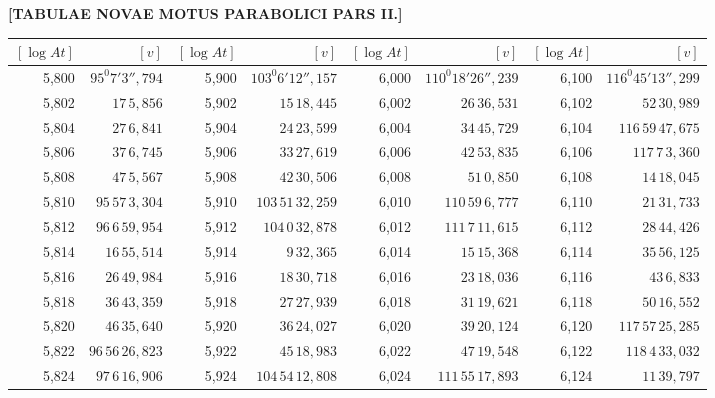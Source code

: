 \clearpage
{}
\begingroup
\centering
\fontsize{9}{9}\selectfont
\setlength{\tabcolsep}{1pt}
\renewcommand{\arraystretch}{.9}
\setlength{\parskip}{0pt}
\textbf{[TABULAE NOVAE MOTUS PARABOLICI PARS II.]}
\par\vspace{7pt}
\begin{tabular}{|r|r||r|r||r|r||r|r|}
\hline
\([\log At]\) & \([v]\) & \([\log At]\) & \([v]\) & \([\log At]\) & \([v]\) & \([\log At]\) & \([v]\) \\
\hline
5,800 & \(95^{0}7'3'',\!794\) & 5,900 & \(103^{0}6'12'',\!157\) & 6,000 & \(110^{0}18'26'',\!239\) & 6,100 & \(116^{0}45'13'',\!299\) \\[1pt]
5,802 & \(17\,5,\!856\) & 5,902 & \(15\,18,\!445\) & 6,002 & \(26\,36,\!531\) & 6,102 & \(52\,30,\!989\) \\
5,804 & \(27\,6,\!841\) & 5,904 & \(24\,23,\!599\) & 6,004 & \(34\,45,\!729\) & 6,104 & \(116\,59\,47,\!675\) \\
5,806 & \(37\,6,\!745\) & 5,906 & \(33\,27,\!619\) & 6,006 & \(42\,53,\!835\) & 6,106 & \(117\,7\,3,\!360\) \\
5,808 & \(47\,5,\!567\) & 5,908 & \(42\,30,\!506\) & 6,008 & \(51\,0,\!850\) & 6,108 & \(14\,18,\!045\) \\
5,810 & \(95\,57\,3,\!304\) & 5,910 & \(103\,51\,32,\!259\) & 6,010 & \(110\,59\,6,\!777\) & 6,110 & \(21\,31,\!733\) \\[1pt]
5,812 & \(96\,6\,59,\!954\) & 5,912 & \(104\,0\,32,\!878\) & 6,012 & \(111\,7\,11,\!615\) & 6,112 & \(28\,44,\!426\) \\
5,814 & \(16\,55,\!514\) & 5,914 & \(9\,32,\!365\) & 6,014 & \(15\,15,\!368\) & 6,114 & \(35\,56,\!125\) \\
5,816 & \(26\,49,\!984\) & 5,916 & \(18\,30,\!718\) & 6,016 & \(23\,18,\!036\) & 6,116 & \(43\,6,\!833\) \\
5,818 & \(36\,43,\!359\) & 5,918 & \(27\,27,\!939\) & 6,018 & \(31\,19,\!621\) & 6,118 & \(50\,16,\!552\) \\
5,820 & \(46\,35,\!640\) & 5,920 & \(36\,24,\!027\) & 6,020 & \(39\,20,\!124\) & 6,120 & \(117\,57\,25,\!285\) \\[1pt]
5,822 & \(96\,56\,26,\!823\) & 5,922 & \(45\,18,\!983\) & 6,022 & \(47\,19,\!548\) & 6,122 & \(118\,4\,33,\!032\) \\
5,824 & \(97\,6\,16,\!906\) & 5,924 & \(104\,54\,12,\!808\) & 6,024 & \(111\,55\,17,\!893\) & 6,124 & \(11\,39,\!797\) \\

\end{tabular}
